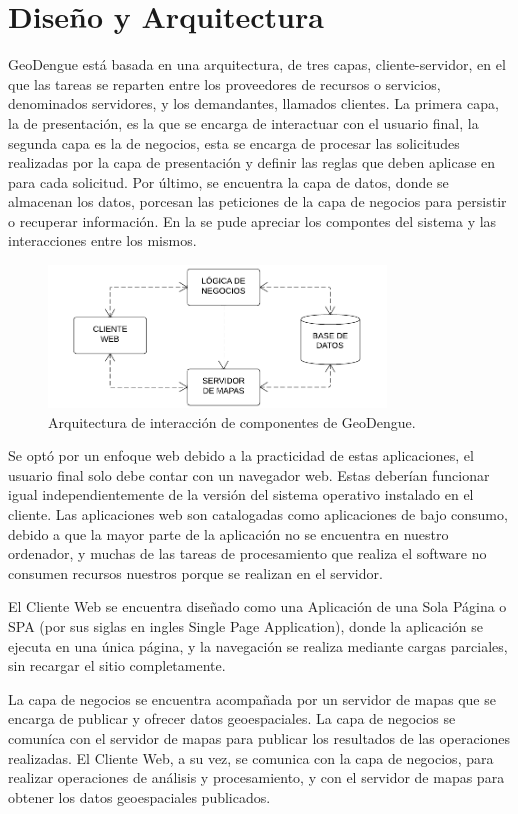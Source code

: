\section{Diseño y Arquitectura}
GeoDengue está basada en una arquitectura, de tres capas, cliente-servidor, en el que las tareas
se reparten entre los proveedores de recursos o servicios, denominados servidores, y los
demandantes, llamados clientes. La primera capa, la de presentación, es la que se encarga de
interactuar con el usuario final, la segunda capa es la de negocios, esta se encarga de procesar
las solicitudes realizadas por la capa de presentación y definir las reglas que deben aplicase en
para cada solicitud. Por último, se encuentra la capa de datos, donde se almacenan los datos,
porcesan las peticiones de la capa de negocios para persistir o recuperar información. En la
 se pude apreciar los compontes del sistema y las interacciones
entre los mismos.

\begin{figure}[H]
\centering
\includegraphics[width=0.8\textwidth]{capitulo-5/graphics/arquitectura-completa.png}
\caption{\label{fig:arquitectura-completa}Arquitectura de interacción de componentes de GeoDengue.}
\end{figure}

Se optó por un enfoque web debido a la practicidad de estas aplicaciones, el usuario final solo
debe contar con un navegador web. Estas deberían funcionar igual independientemente de la versión
del sistema operativo instalado en el cliente. Las aplicaciones web son catalogadas como
aplicaciones de bajo consumo, debido a que la mayor parte de la aplicación no se encuentra en
nuestro ordenador, y muchas de las tareas de procesamiento que realiza el software no consumen
recursos nuestros porque se realizan en el servidor.

El Cliente Web se encuentra diseñado como una Aplicación de una Sola Página o SPA (por sus siglas
en ingles Single Page Application), donde la aplicación se ejecuta en una única página, y la
navegación se realiza mediante cargas parciales, sin recargar el sitio completamente.

La capa de negocios se encuentra acompañada por un servidor de mapas que se encarga de publicar y
ofrecer datos geoespaciales. La capa de negocios se comuníca con el servidor de mapas para
publicar los resultados de las operaciones realizadas. El Cliente Web, a su vez, se comunica con
la capa de negocios, para realizar operaciones de análisis y procesamiento, y con el servidor de
mapas para obtener los datos geoespaciales publicados.

